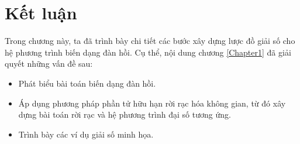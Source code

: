 \section{Kết luận}
Trong chương này, ta đã trình bày chi tiết các bước xây dựng lược đồ giải số cho hệ phương trình biến dạng đàn hồi. Cụ thể, nội dung chương \ref{Chapter1} đã giải quyết những vấn đề sau:
\begin{itemize}
\item Phát biểu bài toán biến dạng đàn hồi.
\item Áp dụng phương pháp phần tử hữu hạn rời rạc hóa không gian, từ đó xây dựng bài toán rời rạc và hệ phương trình đại số tương ứng.
\item Trình bày các ví dụ giải số minh họa.
\end{itemize}

